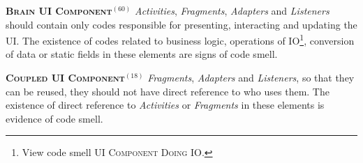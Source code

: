   \noindent
  \textsc{\textbf{{\small Brain UI Component}}}$^{(60)}$ \textit{Activities}, \textit{Fragments}, \textit{Adapters} and \textit{Listeners} should contain only codes responsible for presenting, interacting and updating the UI. The existence of codes related to business logic, operations of IO\footnote{View code smell \textsc{\small UI Component Doing IO}.}, conversion of data or static fields in these elements are signs of code smell.


  \noindent
  \textbf{\textsc{{\small Coupled UI Component}}}$^{(18)}$ \textit{Fragments}, \textit{Adapters} and \textit{Listeners}, so that they can be reused, they should not have direct reference to who uses them. The existence of direct reference to \textit{Activities} or \textit{Fragments} in these elements is evidence of code smell.


